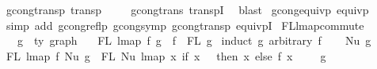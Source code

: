 \begin{isabellebody}
%
\endisadelimproof
\isanewline
{}\isamarkupfalse%
\ gcong{\isacharunderscore}{\kern0pt}transp{\isacharcolon}{\kern0pt}\ {\isachardoublequoteopen}transp\ {\isacharparenleft}{\kern0pt}{\isasymsimeq}{\isacharparenright}{\kern0pt}{\isachardoublequoteclose}\isanewline
%
\isadelimproof
\ \ %
\endisadelimproof
%
\isatagproof
{}\isamarkupfalse%
\ gcong{\isachardot}{\kern0pt}trans\ transpI\ \isamarkupfalse%
\ blast%
\endisatagproof
{\isafoldproof}%
%
\isadelimproof
\isanewline
%
\endisadelimproof
\isanewline
{}\isamarkupfalse%
\ gcong{\isacharunderscore}{\kern0pt}equivp{\isacharcolon}{\kern0pt}\ {\isachardoublequoteopen}equivp\ {\isacharparenleft}{\kern0pt}{\isasymsimeq}{\isacharparenright}{\kern0pt}{\isachardoublequoteclose}\isanewline
%
\isadelimproof
\ \ %
\endisadelimproof
%
\isatagproof
{}\isamarkupfalse%
\ {\isacharparenleft}{\kern0pt}simp\ add{\isacharcolon}{\kern0pt}\ gcong{\isacharunderscore}{\kern0pt}reflp\ gcong{\isacharunderscore}{\kern0pt}symp\ gcong{\isacharunderscore}{\kern0pt}transp\ equivpI{\isacharparenright}{\kern0pt}%
\endisatagproof
{\isafoldproof}%
%
\isadelimproof
%
\endisadelimproof
%
\isadelimdocument
%
\endisadelimdocument
%
\isatagdocument
%
\isamarkuptrue%
%
\isamarkuptrue%
%
\endisatagdocument
{\isafolddocument}%
%
\isadelimdocument
%
\endisadelimdocument
{}\isamarkupfalse%
\ FL{\isacharunderscore}{\kern0pt}lmap{\isacharunderscore}{\kern0pt}commute{\isacharcolon}{\kern0pt}\isanewline
\ \ \ g\ {\isacharcolon}{\kern0pt}{\isacharcolon}{\kern0pt}\ {\isachardoublequoteopen}{\isacharprime}{\kern0pt}ty\ graph{\isachardoublequoteclose}\isanewline
\ \ \ {\isachardoublequoteopen}FL\ {\isacharparenleft}{\kern0pt}lmap\ f\ g{\isacharparenright}{\kern0pt}\ {\isacharequal}{\kern0pt}\ f\ {\isacharbackquote}{\kern0pt}\ {\isacharparenleft}{\kern0pt}FL\ g{\isacharparenright}{\kern0pt}{\isachardoublequoteclose}\isanewline
%
\isadelimproof
%
\endisadelimproof
%
\isatagproof
{}\isamarkupfalse%
\ {\isacharparenleft}{\kern0pt}induct\ g\ arbitrary{\isacharcolon}{\kern0pt}\ f{\isacharparenright}{\kern0pt}\isanewline
\ \ \isamarkupfalse%
\ {\isacharparenleft}{\kern0pt}Nu\ g{\isacharparenright}{\kern0pt}\isanewline
\ \ \isamarkupfalse%
\ {\isachardoublequoteopen}FL\ {\isacharparenleft}{\kern0pt}lmap\ f\ {\isacharparenleft}{\kern0pt}Nu\ g{\isacharparenright}{\kern0pt}{\isacharparenright}{\kern0pt}\ {\isacharequal}{\kern0pt}\ FL\ {\isacharparenleft}{\kern0pt}Nu\ {\isacharparenleft}{\kern0pt}lmap\ {\isacharparenleft}{\kern0pt}{\isasymlambda}x{\isachardot}{\kern0pt}\ if\ x\ {\isacharequal}{\kern0pt}\ {}\ then\ x\ else\ {\isacharparenleft}{\kern0pt}f\ {\isacharparenleft}{\kern0pt}x\ {\isacharminus}{\kern0pt}\ {}{\isacharparenright}{\kern0pt}\ {\isacharplus}{\kern0pt}\ {}{\isacharparenright}{\kern0pt}{\isacharparenright}{\kern0pt}\ g{\isacharparenright}{\kern0pt}{\isacharparenright}{\kern0pt}{\isachardoublequoteclose}\isanewline

\end{isabellebody}
